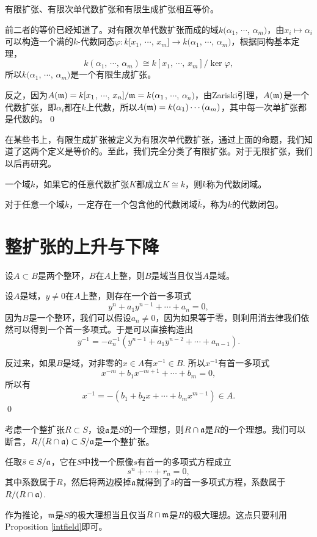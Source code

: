 \pro  有限扩张、有限次单代数扩张和有限生成扩张相互等价。

\proof 前二者的等价已经知道了。对有限次单代数扩张而成的域$k(\alpha_1$, $\cdots$, $\alpha_m)$，由$x_i\mapsto \alpha_i$可以构造一个满的$k$-代数同态$\varphi:k[x_1$, $\cdots$, $x_m]\to k(\alpha_1$, $\cdots$, $\alpha_m)$，根据同构基本定理，
\[
	k(\alpha_1,\,\cdots\!,\,\alpha_m)\cong k[x_1,\,\cdots\!,\,x_m]/\ker \varphi,
\]
所以$k(\alpha_1$, $\cdots$, $\alpha_m)$是一个有限生成扩张。

反之，因为$A(\mathfrak{m})=k[x_1$, $\cdots$, $x_n]/\mathfrak{m}=k(\alpha_1$, $\cdots$, $\alpha_n)$，由Zariski引理，$A(\mathfrak{m})$是一个代数扩张，即$\alpha_i$都在$k$上代数，所以$A(\mathfrak{m})=k(\alpha_1)\cdots(\alpha_m)$，其中每一次单扩张都是代数的。\qed

在某些书上，有限生成扩张被定义为有限次单代数扩张，通过上面的命题，我们知道了这两个定义是等价的。至此，我们完全分类了有限扩张。对于无限扩张，我们以后再研究。

\para 一个域$k$，如果它的任意代数扩张$K$都成立$K\cong k$，则$k$称为代数闭域。

\theo 对于任意一个域$k$，一定存在一个包含他的代数闭域$\bar{k}$，称为$k$的代数闭包。

\section{整扩张的上升与下降}

\pro \label{intfield} 设$A\subset B$是两个整环，$B$在$A$上整，则$B$是域当且仅当$A$是域。

\proof
	设$A$是域，$y\neq 0$在$A$上整，则存在一个首一多项式
	\[
	y^n+a_1y^{n-1}+\cdots+a_n=0,
	\]
	因为$B$是一个整环，我们可以假设$a_n\neq 0$，因为如果等于零，则利用消去律我们依然可以得到一个首一多项式。于是可以直接构造出
	\[
	y^{-1}=-a_n^{-1}(y^{n-1}+a_1y^{n-2}+\cdots+a_{n-1}).
	\]

	反过来，如果$B$是域，对非零的$x\in A$有$x^{-1}\in B$. 所以$x^{-1}$有首一多项式
	\[
	x^{-m}+b_1x^{-m+1}+\cdots+b_m=0,
	\]
	所以有
	\[
	x^{-1}=-(b_1+b_2x+\cdots+b_mx^{m-1})\in A.
	\]
\qed

\para 考虑一个整扩张$R\subset S$，设$\mathfrak{a}$是$S$的一个理想，则$R\cap \mathfrak{a}$是$R$的一个理想。我们可以断言，$R/(R\cap \mathfrak{a})\subset S/\mathfrak{a}$是一个整扩张。

任取$\bar{s}\in S/\mathfrak{a}$，它在$S$中找一个原像$s$有首一的多项式方程成立
\[
	s^n+\cdots+r_n=0,
\]
其中系数属于$R$，然后将两边模掉$\mathfrak{a}$就得到了$\bar{s}$的首一多项式方程，系数属于$R/(R\cap \mathfrak{a})$.

作为推论，$\mathfrak{m}$是$S$的极大理想当且仅当$R\cap \mathfrak{m}$是$R$的极大理想。这点只要利用Proposition \eqref{intfield}即可。

